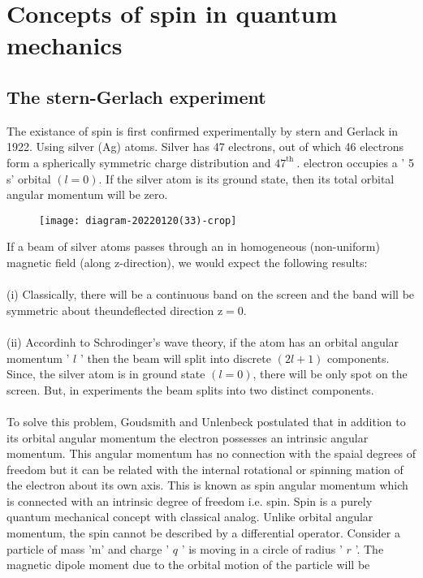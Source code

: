 \section{Concepts of spin in quantum mechanics}
\subsection{ The stern-Gerlach experiment}
The existance of spin is first confirmed experimentally by stern and Gerlack in 1922. Using silver (Ag) atoms. Silver has 47 electrons, out of which 46 electrons form a spherically symmetric charge distribution and $47^{\text {th }}$. electron occupies a ' 5 s' orbital $(l=0)$. If the silver atom is its ground state, then its total orbital angular momentum will be zero.\\
\begin{figure}[H]
	\centering
	\texttt{[image: diagram-20220120(33)-crop]}
	\caption{}
	\label{}
\end{figure}
If a beam of silver atoms passes through an in homogeneous (non-uniform) magnetic field (along z-direction), we would expect the following results:\\\\
(i) Classically, there will be a continuous band on the screen and the band will be symmetric about theundeflected direction $\mathrm{z}=0$.\\\\
(ii) Accordinh to Schrodinger's wave theory, if the atom has an orbital angular momentum ' $l$ ' then the beam will split into discrete $(2 l+1)$ components. Since, the silver atom is in ground state $(l=0)$, there will be only spot on the screen.
But, in experiments the beam splits into two distinct components.\\\\
To solve this problem, Goudsmith and Unlenbeck postulated that in addition to its orbital angular momentum the electron possesses an intrinsic angular momentum. This angular momentum has no connection with the spaial degrees of freedom but it can be related with the internal rotational or spinning mation of the electron about its own axis. This is known as spin angular momentum which is connected with an intrinsic degree of freedom i.e. spin. Spin is a purely quantum mechanical concept with classical analog. Unlike orbital angular momentum, the spin cannot be described by a differential operator.
Consider a particle of mass 'm' and charge ' $q$ ' is moving in a circle of radius ' $r$ '. The magnetic dipole moment due to the orbital motion of the particle will be

